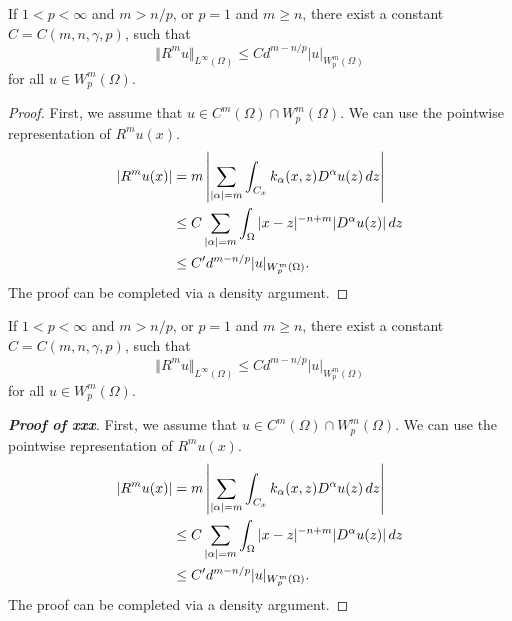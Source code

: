 \documentclass[fontset=none]{ctexart}
\begin{document}
\begin{theorem}
    If $1<p<\infty$ and $m > n/p$, or $p=1$ and $m \ge n$, there exist a constant $C = C(m,n,\gamma,p)$, such that
    \begin{equation*}
        \Vert R^m u \Vert_{L^\infty(\Omega)} \le C d^{m-n/p} |u|_{W^m_p(\Omega)}
    \end{equation*}
    for all $u \in W^m_p(\Omega)$.
\end{theorem}
\begin{proof}
    First, we assume that $u \in C^m(\Omega) \cap W^m_p(\Omega)$. We can use the pointwise representation of $R^mu(x)$.
    \begin{align*}
        |R^mu(x)| ={} & m \left| \sum_{|\alpha| = m} \int_{C_x} k_{\alpha}(x,z) D^\alpha u(z)\,dz \right| \notag \\
        \le{}         & C \sum_{|\alpha|=m} \int_{\Omega} |x-z|^{-n+m} |D^\alpha u(z)|\,dz \notag                \\
        \le{}         & C' d^{m-n/p} |u|_{W^m_p(\Omega)}.
    \end{align*}
    The proof can be completed via a density argument.
\end{proof}

\begin{theorem}[xxx]
    If $1<p<\infty$ and $m > n/p$, or $p=1$ and $m \ge n$, there exist a constant $C = C(m,n,\gamma,p)$, such that
    \begin{equation*}
        \Vert R^m u \Vert_{L^\infty(\Omega)} \le C d^{m-n/p} |u|_{W^m_p(\Omega)}
    \end{equation*}
    for all $u \in W^m_p(\Omega)$.
\end{theorem}
\begin{proof}[\upshape\bfseries Proof of xxx]
    First, we assume that $u \in C^m(\Omega) \cap W^m_p(\Omega)$. We can use the pointwise representation of $R^mu(x)$.
    \begin{align*}
        |R^mu(x)| ={} & m \left| \sum_{|\alpha| = m} \int_{C_x} k_{\alpha}(x,z) D^\alpha u(z)\,dz \right| \notag \\
        \le{}         & C \sum_{|\alpha|=m} \int_{\Omega} |x-z|^{-n+m} |D^\alpha u(z)|\,dz \notag                \\
        \le{}         & C' d^{m-n/p} |u|_{W^m_p(\Omega)}.
    \end{align*}
    The proof can be completed via a density argument.
\end{proof}
\end{document}
